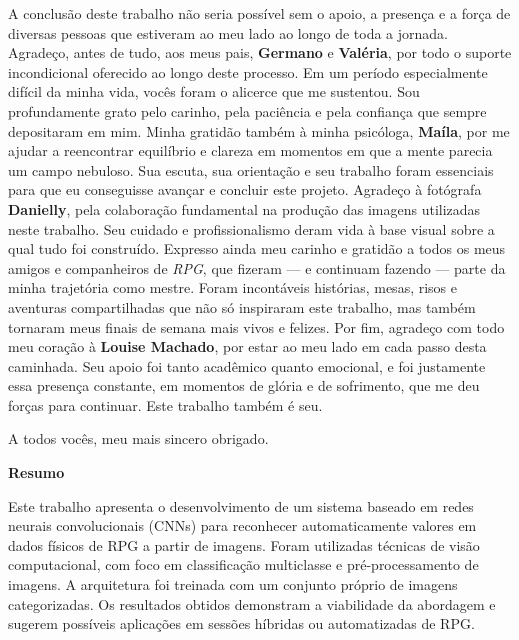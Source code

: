 \documentclass[12pt]{article}
\begin{document}
A conclusão deste trabalho não seria possível sem o apoio, a presença e a força de diversas pessoas que estiveram ao meu lado ao longo de toda 
a jornada. Agradeço, antes de tudo, aos meus pais, \textbf{Germano} e \textbf{Valéria}, por todo o suporte incondicional oferecido ao 
longo deste processo. Em um período especialmente difícil da minha vida, vocês foram o alicerce que me sustentou. Sou profundamente 
grato pelo carinho, pela paciência e pela confiança que sempre depositaram em mim. Minha gratidão também à minha psicóloga, \textbf{Maíla}, 
por me ajudar a reencontrar equilíbrio e clareza em momentos em que a mente parecia um campo nebuloso. Sua escuta, sua orientação e seu 
trabalho foram essenciais para que eu conseguisse avançar e concluir este projeto. Agradeço à fotógrafa \textbf{Danielly},
 pela colaboração fundamental na produção das imagens utilizadas neste trabalho. Seu cuidado e profissionalismo deram vida à base visual 
 sobre a qual tudo foi construído. Expresso ainda meu carinho e gratidão a todos os meus amigos e companheiros de \textit{RPG}, 
 que fizeram — e continuam fazendo — parte da minha trajetória como mestre. Foram incontáveis histórias, mesas, risos e aventuras 
 compartilhadas que não só inspiraram este trabalho, mas também tornaram meus finais de semana mais vivos e felizes. Por fim, agradeço com 
 todo meu coração à \textbf{Louise Machado}, por estar ao meu lado em cada passo desta caminhada. Seu apoio foi tanto acadêmico quanto
 emocional, e foi justamente essa presença constante, em momentos de glória e de sofrimento, que me deu forças para continuar. Este 
 trabalho também é seu.

A todos vocês, meu mais sincero obrigado.



\newpage

\begin{center}
    \Large\textbf{Resumo}
\end{center}

\noindent
Este trabalho apresenta o desenvolvimento de um sistema baseado em redes neurais convolucionais (CNNs) para 
reconhecer automaticamente valores em dados físicos de RPG a partir de imagens. Foram utilizadas técnicas 
de visão computacional, com foco em classificação multiclasse e pré-processamento de imagens. A arquitetura 
foi treinada com um conjunto próprio de imagens categorizadas. Os resultados obtidos demonstram a viabilidade 
da abordagem e sugerem possíveis aplicações em sessões híbridas ou automatizadas de RPG.
\end{document}
